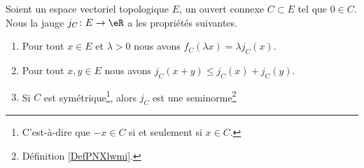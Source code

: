 \begin{proposition}	\label{PROPooEBPPooDWUwLx}
	Soient un espace vectoriel topologique \( E\), un ouvert connexe \( C\subset E\) tel que \( 0\in C\). Nous la jauge \(j_C \colon E\to \eR  \) a les propriétés suivantes.
	\begin{enumerate}
		\item		\label{ITEMooAOUUooGhrpk}
		      Pour tout \( x\in E\) et \( \lambda>0\) nous avons \( f_C(\lambda x)=\lambda j_C(x)\).
		\item		\label{ITEMooQWIQooMRramc}
		      Pour tout \( x,y\in E\) nous avons \( j_C(x+y)\leq j_C(x)+j_C(y)\).
		\item		\label{ITEMooKGNFooKAEUPH}
		      Si \( C\) est symétrique\footnote{C'est-à-dire que \( -x\in C\) si et seulement si \( x\in C\).}, alors \( j_C\) est une seminorme\footnote{Définition \ref{DefPNXlwmi}.}
	\end{enumerate}
\end{proposition}

